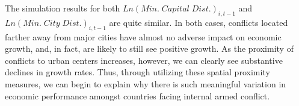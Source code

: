 The simulation results for both $Ln(Min. \; Capital \; Dist.)_{i,t-1}$ and $Ln(Min. \; City \; Dist.)_{i,t-1}$ are quite similar. In both cases, conflicts located farther away from major cities have almost no adverse impact on economic growth, and, in fact, are likely to still see positive growth. As the proximity of conflicts to urban centers increases, however, we can clearly see substantive declines in growth rates. Thus, through utilizing these spatial proximity measures, we can begin to explain why there is such meaningful variation in economic performance amongst countries facing internal armed conflict.
